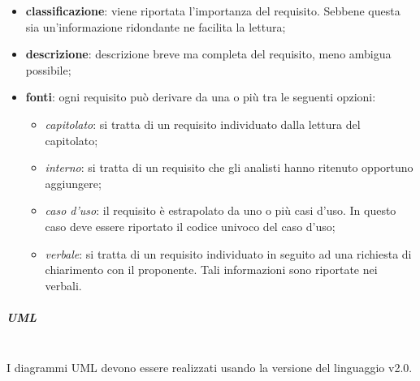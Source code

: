 \begin{itemize}
\begin{itemize}
	\end{itemize}
	\item \textbf{classificazione}: viene riportata l'importanza del requisito. Sebbene questa sia un'informazione ridondante ne facilita la lettura;
	\item \textbf{descrizione}: descrizione breve ma completa del requisito, meno ambigua possibile;
	\item \textbf{fonti}: ogni requisito può derivare da una o più tra le seguenti opzioni:
	\begin{itemize}
		\item \textit{capitolato}: si tratta di un requisito individuato dalla lettura del capitolato;
		\item \textit{interno}: si tratta di un requisito che gli analisti hanno ritenuto opportuno aggiungere;
		\item \textit{caso d'uso}: il requisito è estrapolato da uno o più casi d'uso. In questo caso deve essere riportato il codice univoco del caso d'uso;
		\item \textit{verbale}: si tratta di un requisito individuato in seguito ad una richiesta di chiarimento con il proponente. Tali informazioni sono riportate nei verbali.
	\end{itemize}
\end{itemize}

\subparagraph{UML} \mbox{}\\
I diagrammi UML devono essere realizzati usando la versione del linguaggio v2.0.

